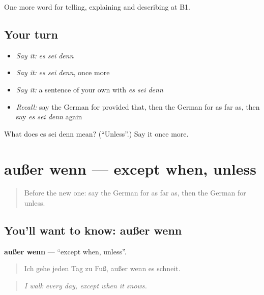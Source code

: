 \begin{grammarlens}[title={What you've built}]
One more word for telling, explaining and describing at B1.
\end{grammarlens}

\subsection*{Your turn}
\begin{itemize}
\raggedright
  \item \emph{Say it:} \emph{es sei denn}
  \item \emph{Say it:} \emph{es sei denn}, once more
  \item \emph{Say it:} a sentence of your own with \emph{es sei denn}
  \item \emph{Recall:} say the German for provided that, then the German for as far as, then say \emph{es sei denn} again
\end{itemize}

\begin{tcolorbox}[breakable,colback=teal!4,colframe=teal!35!black,title={Before you move on}]
What does es sei denn mean? (\textquotedblleft{}Unless\textquotedblright{}.) Say it once more.
\end{tcolorbox}
\section[außer wenn]{außer wenn — except when, unless}

\label{lesson:GE-C365-ausser-wenn}



\begin{quote}
Before the new one: say the German for as far as, then the German for unless.
\end{quote}

\subsection*{You'll want to know: außer wenn}
\textbf{außer wenn} — \textquotedblleft{}except when, unless\textquotedblright{}.

\begin{quote}
Ich gehe jeden Tag zu Fuß, außer wenn es schneit.
\end{quote}

\begin{quote}
\emph{I walk every day, except when it snows.}
\end{quote}

